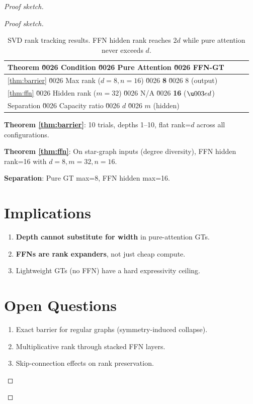 \documentclass[11pt,a4paper]{amsart}
\theoremstyle{plain}
\theoremstyle{definition}
\begin{document}
\begin{proof}[Proof sketch]
\begin{proof}[Proof sketch]
\begin{table}[h]
\centering
\begin{tabular}{@{}llcc@{}}
\toprule
Theorem \u0026 Condition \u0026 Pure Attention \u0026 FFN-GT \\
\midrule
\ref{thm:barrier} \u0026 Max rank ($d=8, n=16$) \u0026 \textbf{8} \u0026 8 (output) \\
\ref{thm:ffn} \u0026 Hidden rank ($m=32$) \u0026 N/A \u0026 \textbf{16} ($\u003e d$) \\
Separation \u0026 Capacity ratio \u0026 $d$ \u0026 $m$ (hidden) \\
\bottomrule
\end{tabular}
\caption{SVD rank tracking results. FFN hidden rank reaches $2d$ while
pure attention never exceeds $d$.}
\end{table}

\textbf{Theorem \ref{thm:barrier}}: 10 trials, depths 1--10, flat
rank=$d$ across all configurations.

\textbf{Theorem \ref{thm:ffn}}: On star-graph inputs (degree
diversity), FFN hidden rank=16 with $d=8, m=32, n=16$.

\textbf{Separation}: Pure GT max=8, FFN hidden max=16.

\section{Implications}

\begin{enumerate}
\item \textbf{Depth cannot substitute for width} in pure-attention GTs.
\item \textbf{FFNs are rank expanders}, not just cheap compute.
\item Lightweight GTs (no FFN) have a hard expressivity ceiling.
\end{enumerate}

\section{Open Questions}

\begin{enumerate}
\item Exact barrier for regular graphs (symmetry-induced collapse).
\item Multiplicative rank through stacked FFN layers.
\item Skip-connection effects on rank preservation.
\end{enumerate}


\end{proof}
\end{proof}
\end{document}
